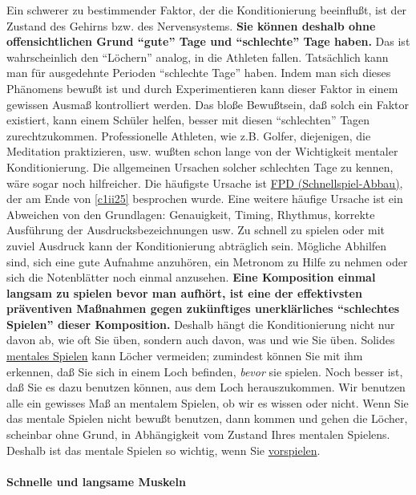 Ein schwerer zu bestimmender Faktor, der die Konditionierung beeinflußt, ist der Zustand des Gehirns bzw. des Nervensystems.
\textbf{Sie können deshalb ohne offensichtlichen Grund \enquote{gute} Tage und \enquote{schlechte} Tage haben.}
Das ist wahrscheinlich den \enquote{Löchern} analog, in die Athleten fallen.
Tatsächlich kann man für ausgedehnte Perioden \enquote{schlechte Tage} haben.
Indem man sich dieses Phänomens bewußt ist und durch Experimentieren kann dieser Faktor in einem gewissen Ausmaß kontrolliert werden.
Das bloße Bewußtsein, daß solch ein Faktor existiert, kann einem Schüler helfen, besser mit diesen \enquote{schlechten} Tagen zurechtzukommen.
Professionelle Athleten, wie z.B. Golfer, diejenigen, die Meditation praktizieren, usw. wußten schon lange von der Wichtigkeit mentaler Konditionierung.
Die allgemeinen Ursachen solcher schlechten Tage zu kennen, wäre sogar noch hilfreicher.
Die häufigste Ursache ist \hyperref[fpd]{FPD (Schnellspiel-Abbau)}, der am Ende von \autoref{c1ii25} besprochen wurde.
Eine weitere häufige Ursache ist ein Abweichen von den Grundlagen: Genauigkeit, Timing, Rhythmus, korrekte Ausführung der Ausdrucksbezeichnungen usw.
Zu schnell zu spielen oder mit zuviel Ausdruck kann der Konditionierung abträglich sein.
Mögliche Abhilfen sind, sich eine gute Aufnahme anzuhören, ein Metronom zu Hilfe zu nehmen oder sich die Notenblätter noch einmal anzusehen.
\textbf{Eine Komposition einmal langsam zu spielen bevor man aufhört, ist eine der effektivsten präventiven Maßnahmen gegen zukünftiges unerklärliches \enquote{schlechtes Spielen} dieser Komposition.}
Deshalb hängt die Konditionierung nicht nur davon ab, wie oft Sie üben, sondern auch davon, was und wie Sie üben.
Solides \hyperref[c1ii12]{mentales Spielen} kann Löcher vermeiden; zumindest können Sie mit ihm erkennen, daß Sie sich in einem Loch befinden, \textit{bevor} sie spielen.
Noch besser ist, daß Sie es dazu benutzen können, aus dem Loch herauszukommen.
Wir benutzen alle ein gewisses Maß an mentalem Spielen, ob wir es wissen oder nicht.
Wenn Sie das mentale Spielen nicht bewußt benutzen, dann kommen und gehen die Löcher, scheinbar ohne Grund, in Abhängigkeit vom Zustand Ihres mentalen Spielens.
Deshalb ist das mentale Spielen so wichtig, wenn Sie \hyperref[c1iii14]{vorspielen}.


\paragraph{Schnelle und langsame Muskeln}
\label{c1iii7aMuskeln}


